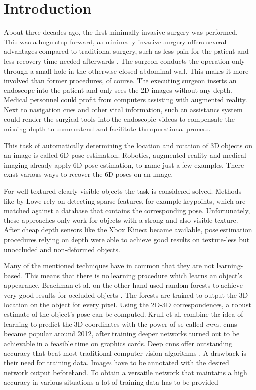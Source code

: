 \chapter{Introduction}

About three decades ago, the first minimally invasive surgery was performed. This was a huge step forward, as minimally invasive surgery offers several advantages compared to traditional surgery, such as less pain for the patient and less recovery time needed afterwards \cite{minimallyinvasive}. The surgeon conducts the operation only through a small hole in the otherwise closed abdominal wall. This makes it more involved than former procedures, of course. The executing surgeon inserts an endoscope into the patient and only sees the 2D images without any depth. Medical personnel could profit from computers assisting with augmented reality. Next to navigation cues and other vital information, such an assistance system could render the surgical tools into the  endoscopic videos to compensate the missing depth to some extend and facilitate the operational process. \

This task of automatically determining the location and rotation of 3D objects on an image is called 6D pose estimation. Robotics, augmented reality and medical imaging already apply 6D pose estimation, to name just a few examples. There exist various ways to recover the 6D poses on an image. 

For well-textured clearly visible objects the task is considered solved. Methods like \cite{dglowe1} by Lowe \etal rely on detecting sparse features, for example keypoints, which are matched against a database that contains the corresponding pose.
Unfortunately, these approaches only work for objects with a strong and also visible texture. After cheap depth sensors like the Xbox Kinect became available, pose estimation procedures relying on depth were able to achieve good results on texture-less but unoccluded and non-deformed objects. 

Many of the mentioned techniques have in common that they are not learning-based. This means that there is no learning procedure which learns an object's appearance. Brachman et al. on the other hand used random forests  to achieve very good results for occluded objects \cite{brachmann1}. The forests are trained to output the 3D location on the object for every pixel. Using the 2D-3D correspondences, a robust estimate of the object's pose can be computed. Krull et al. \cite{akrull} combine the idea of learning to predict the 3D coordinates  with the power of so called \textit{\acp{cnn}}. \acp{cnn} became popular around 2012, after training deeper networks turned out to be achievable in a feasible time on graphics cards. Deep \acp{cnn} offer outstanding accuracy that beat most traditional computer vision algorithms \cite{ylecun}. A drawback is their need for training data. Images have to be annotated with the desired network output beforehand. To obtain a versatile network that maintains a high accuracy in various situations a lot of training data has to be provided.

